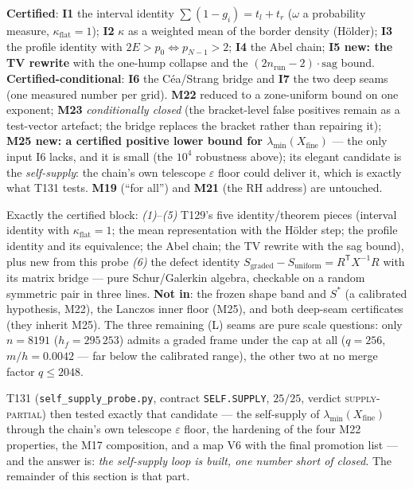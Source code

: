 \documentclass[11pt,a4paper]{article}
\begin{document}
\begin{keybox}
\textbf{Certified}: \textbf{I1} the interval identity $\sum(1-g_i)=t_l+t_r$ ($\omega$ a
probability measure, $\kappa_{\mathrm{flat}}=1$); \textbf{I2} $\kappa$ as a weighted mean of
the border density (H\"older); \textbf{I3} the profile identity with
$2E>p_0\iff p_{N-1}>2$; \textbf{I4} the Abel chain; \textbf{I5 new: the TV rewrite} with the
one-hump collapse and the $(2n_{\mathrm{run}}-2)\cdot\mathrm{sag}$ bound.
\textbf{Certified-conditional}: \textbf{I6} the C\'ea/Strang bridge and \textbf{I7} the two
deep seams (one measured number per grid). \textbf{M22} reduced to a zone-uniform bound on
one exponent; \textbf{M23} \emph{conditionally closed} (the bracket-level false positives
remain as a test-vector artefact; the bridge replaces the bracket rather than repairing it);
\textbf{M25 new: a certified positive lower bound for
$\lambda_{\min}(X_{\mathrm{fine}})$} --- the only input I6 lacks, and it is small (the
$10^4$ robustness above); its elegant candidate is the \emph{self-supply}: the chain's own
telescope $\varepsilon$ floor could deliver it, which is exactly what T131 tests.
\textbf{M19} (``for all'') and \textbf{M21} (the RH address) are untouched.
\end{keybox}

\begin{keybox}
Exactly the certified block: \emph{(1)}--\emph{(5)} T129's five identity/theorem pieces
(interval identity with $\kappa_{\mathrm{flat}}=1$; the mean representation with the
H\"older step; the profile identity and its equivalence; the Abel chain; the TV rewrite with
the sag bound), plus new from this probe \emph{(6)} the defect identity
$S_{\mathrm{graded}}-S_{\mathrm{uniform}}=R^{\mathsf T}X^{-1}R$ with its matrix bridge ---
pure Schur/Galerkin algebra, checkable on a random symmetric pair in three lines.
\textbf{Not in}: the frozen shape band and $S^*$ (a calibrated hypothesis, M22), the Lanczos
inner floor (M25), and both deep-seam certificates (they inherit M25). The three remaining
(L) seams are pure scale questions: only $n=8191$ ($h_f=295\,253$) admits a graded frame
under the cap at all ($q=256$, $m/h=0.0042$ --- far below the calibrated range), the other
two at no merge factor $q\le2048$.
\end{keybox}

\noindent T131 (\texttt{self\_supply\_probe.py}, contract \texttt{SELF.SUPPLY}, $25/25$,
verdict \textsc{supply-partial}) then tested exactly that candidate --- the self-supply of
$\lambda_{\min}(X_{\mathrm{fine}})$ through the chain's own telescope $\varepsilon$ floor,
the hardening of the four M22 properties, the M17 composition, and a map V6 with the final
promotion list --- and the answer is: \emph{the self-supply loop is built, one number short
of closed}. The remainder of this section is that part.
\end{document}
